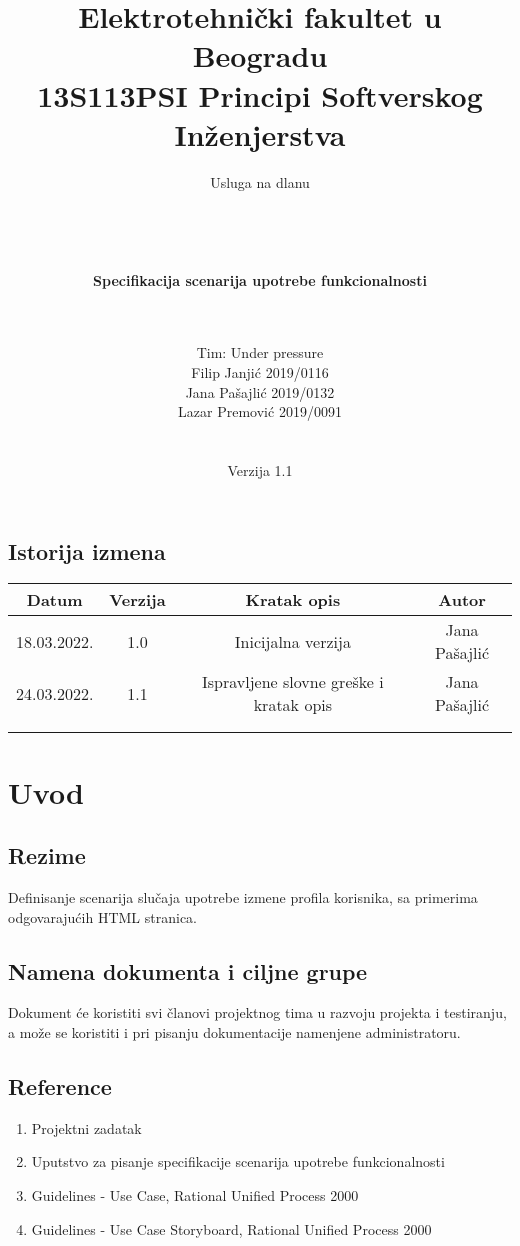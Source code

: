 \documentclass[a4paper,12pt]{report}
\title{\Large Elektrotehnički fakultet u Beogradu \\ 13S113PSI Principi Softverskog Inženjerstva}
\author{\Huge Usluga na dlanu\\ \ \\ \ \\ \ \\ \ \\
	\Large \textbf{Specifikacija scenarija upotrebe funkcionalnosti}\\\Large \textbf{\genitivfunkcionalnosti} \\ \ \\}
\date{\Large   Tim: Under pressure \\ Filip Janjić 2019/0116 \\ Jana Pašajlić 2019/0132 \\ Lazar Premović 2019/0091  \\ \  \\ \  \\\large Verzija 1.1}
\newcommand{\inicijalniautor}{Jana Pašajlić}
\newcommand{\inicijalnidatum}{18.03.2022.}
\begin{document}
\maketitle

\begin{center}
\section*{Istorija izmena}
\begin{tabular}{ |c|c|c|c| }
\hline
\textbf{Datum} & \textbf{Verzija} & \textbf{Kratak opis} & \textbf{Autor} \\ 
\hline
 \inicijalnidatum & 1.0  & Inicijalna verzija & \inicijalniautor \\
 \hline
 24.03.2022. & 1.1  & Ispravljene slovne greške i kratak opis & \inicijalniautor  \\
 \hline
 &  &  &  \\
 \hline
 &  &  &  \\
 \hline
\end{tabular}
\end{center}
\newpage

\tableofcontents

\newpage
\section{Uvod}
\subsection{Rezime}
    Definisanje scenarija slučaja upotrebe izmene profila korisnika, sa primerima odgovarajućih HTML stranica.
\subsection{Namena dokumenta i ciljne grupe}
    Dokument će koristiti svi članovi projektnog tima u razvoju projekta i testiranju, a može se koristiti i pri pisanju dokumentacije namenjene administratoru.
\subsection{Reference}
 \begin{enumerate}
    \item Projektni zadatak
    \item Uputstvo za pisanje specifikacije scenarija upotrebe funkcionalnosti 
    \item Guidelines - Use Case, Rational Unified Process 2000
    \item Guidelines - Use Case Storyboard, Rational Unified Process 2000
 \end{enumerate}
\end{document}
